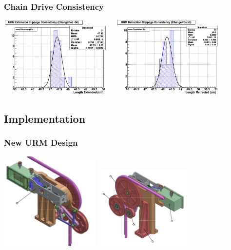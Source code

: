 \documentclass{beamer}
\begin{document}
\begin{frame}
\frametitle{Chain Drive Consistency}
\centering\includegraphics[width=6cm]{Hist3.png}
\centering\includegraphics[width=6cm]{Hist4.png}
\end{frame}


\subsection{Implementation}

\begin{frame}
\frametitle{New URM Design}
\centering\includegraphics[width=5cm]{newsch1.png}
\centering\includegraphics[width=5cm]{newsch2.png}
\end{frame}
\end{document}
